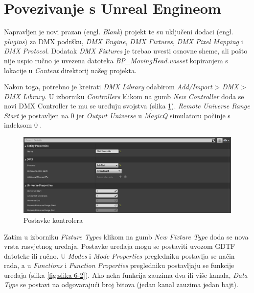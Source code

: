 \documentclass[times, utf8, zavrsni, numeric]{fer}
\begin{document}
\section{Povezivanje s Unreal Engineom}
Napravljen je novi prazan (engl. \emph{Blank}) projekt te su uključeni dodaci (engl. \emph{plugins}) za DMX podršku, \emph{DMX Engine}, \emph{DMX Fixtures}, \emph{DMX Pixel Mapping} i \emph{DMX Protocol}. Dodatak \emph{DMX Fixtures} je trebao uvesti osnovne sheme, ali pošto nije uspio ručno je uvezena datoteka \emph{BP\_MovingHead.uasset} kopiranjem s lokacije \newline u \emph{Content} direktorij našeg projekta.

Nakon toga, potrebno je kreirati \emph{DMX Library} odabirom \emph{Add/Import} > \emph{DMX} > \emph{DMX Library}. U izborniku \emph{Controllers} klikom na gumb \emph{New Controller} doda se novi DMX Controller te mu se uređuju svojstva (slika \ref{fig:slika 6-1}). \emph{Remote Universe Range Start} je postavljen na 0 jer \emph{Output Universe} u \emph{MagicQ} simulatoru počinje s indeksom 0 \cite{MagicQ_Setup}.

\begin{figure}[htp]
	\centering
	\includegraphics[width=\linewidth]{slika 6-1.png}
	\caption{Postavke kontrolera}
	\label{fig:slika 6-1}
\end{figure}

Zatim u izborniku \emph{Fixture Types} klikom na gumb \emph{New Fixture Type} doda se nova vrsta rasvjetnog uređaja. Postavke uređaja mogu se postaviti uvozom GDTF datoteke ili ručno. U \emph{Modes} i \emph{Mode Properties} pregledniku postavlja se način rada, a u \emph{Functions} i \emph{Function Properties} pregledniku postavljaju se funkcije uređaja (slika \ref{fig:slika 6-2}). Ako neka funkcija zauzima dva ili više kanala, \emph{Data Type} se postavi na odgovarajući broj bitova (jedan kanal zauzima jedan bajt).
\end{document}
